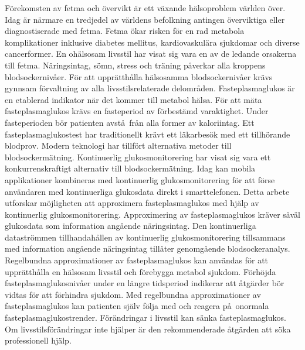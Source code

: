 \documentclass[english, 12pt, a4paper, elec, utf8, a-1b, online]{aaltothesis}
\begin{document}
\begin{abstractpage}[swedish]
F\"{o}rekomsten av fetma och \"{o}vervikt \"{a}r ett v\"{a}xande h\"{a}lsoproblem v\"{a}rlden \"{o}ver. Idag \"{a}r n\"{a}rmare en tredjedel av v\"{a}rldens befolkning antingen \"{o}verviktiga eller diagnostiserade med fetma. Fetma \"{o}kar risken f\"{o}r en rad metabola komplikationer inklusive diabetes mellitus, kardiovaskul\"{a}ra sjukdomar och diverse cancerformer. En oh\"{a}lsosam livsstil har visat sig vara en av de ledande orsakerna till fetma. N\"{a}ringsintag, s\"{o}mn, stress och tr\"{a}ning p\aa verkar alla kroppens blodsockerniv\aa er. F\"{o}r att uppr\"{a}tth\aa lla h\"{a}lsosamma blodsockerniv\aa er kr\"{a}vs gynnsam f\"{o}rvaltning av alla livsstilsrelaterade delomr\aa den.
Fasteplasmaglukos \"{a}r en etablerad indikator n\"{a}r det kommer till metabol h\"{a}lsa. F\"{o}r att m\"{a}ta fasteplasmaglukos kr\"{a}vs en fasteperiod av f\"{o}rbest\"{a}md varaktighet. Under fasteperioden b\"{o}r patienten avst\aa\ fr\aa n alla former av kaloriintag. Ett fasteplasmaglukostest har traditionellt kr\"{a}vt ett l\"{a}karbes\"{o}k med ett tillh\"{o}rande blodprov. Modern teknologi har tillf\"{o}rt alternativa metoder till blodsockerm\"{a}tning. Kontinuerlig glukosmonitorering har visat sig vara ett konkurrenskraftigt alternativ till blodsockerm\"{a}tning. Idag kan mobila applikationer kombineras med kontinuerlig glukosmonitorering f\"{o}r att f\"{o}rse anv\"{a}ndaren med kontinuerliga glukosdata direkt i smarttelefonen. 
Detta arbete utforskar m\"{o}jligheten att approximera fasteplasmaglukos med hj\"{a}lp av kontinuerlig glukosmonitorering. Approximering av fasteplasmaglukos kr\"{a}ver s\aa v\"{a}l glukosdata som information ang\aa ende n\"{a}ringsintag. Den kontinuerliga datastr\"{o}mmen tillhandah\aa llen av kontinuerlig glukosmonitorering tillsammans med information ang\aa ende n\"{a}ringsintag till\aa ter genomg\aa ende blodsockeranalys. Regelbundna approximationer av fasteplasmaglukos kan anv\"{a}ndas f\"{o}r att uppr\"{a}tth\aa lla en h\"{a}lsosam livsstil och f\"{o}rebygga metabol sjukdom. F\"{o}rh\"{o}jda fasteplasmaglukosniv\aa er under en l\"{a}ngre tidsperiod indikerar att \aa tg\"{a}rder b\"{o}r vidtas f\"{o}r att f\"{o}rhindra sjukdom. Med regelbundna approximationer av fasteplasmaglukos kan patienten sj\"{a}lv f\"{o}lja med och reagera p\aa\ onormala fasteplasmaglukostrender. F\"{o}r\"{a}ndringar i livsstil kan s\"{a}nka fasteplasmaglukos. Om livsstilsf\"{o}r\"{a}ndringar inte hj\"{a}lper \"{a}r den rekommenderade \aa tg\"{a}rden att s\"{o}ka professionell hj\"{a}lp. 

\end{abstractpage}
\end{document}
